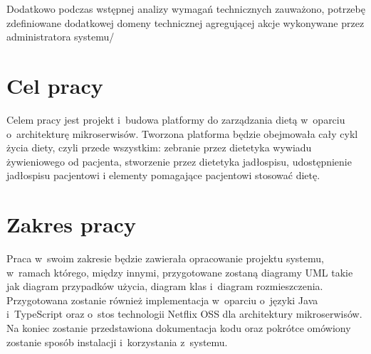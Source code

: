 Dodatkowo podczas wstępnej analizy wymagań technicznych zauważono, potrzebę zdefiniowane dodatkowej domeny technicznej agregującej akcje wykonywane przez administratora systemu/

\section*{Cel pracy}\label{sec:thesis-goal}

Celem pracy jest projekt i~budowa platformy do zarządzania dietą w~oparciu o~architekturę mikroserwisów.
Tworzona platforma będzie obejmowała cały cykl życia diety, czyli przede wszystkim:
zebranie przez dietetyka wywiadu żywieniowego od pacjenta,
stworzenie przez dietetyka jadłospisu,
udostępnienie jadłospisu pacjentowi
i elementy pomagające pacjentowi stosować dietę.

\section*{Zakres pracy}\label{sec:scope-of-work}

Praca w~swoim zakresie będzie zawierała
opracowanie projektu systemu, w~ramach którego, między innymi, przygotowane zostaną diagramy UML takie jak diagram przypadków użycia, diagram klas i~diagram rozmieszczenia.
Przygotowana zostanie również implementacja w~oparciu o~języki Java\cite{tech:java} i~TypeScript\cite{tech:typescript} oraz o~stos technologii Netflix OSS\cite{tech:netflix-oss} dla architektury mikroserwisów.
Na koniec zostanie przedstawiona dokumentacja kodu oraz pokrótce omówiony zostanie sposób instalacji i~korzystania z~systemu.

\thispagestyle{normal}
